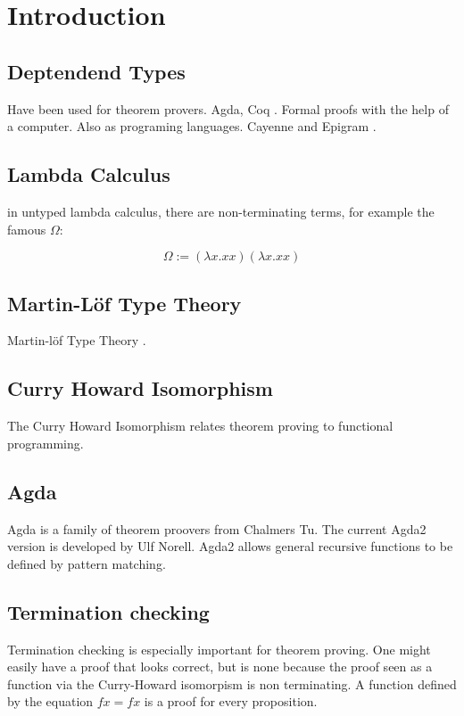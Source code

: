 \chapter{Introduction}
\section {Deptendend Types}
Have been used for theorem provers.
Agda, Coq \cite{coq}.
Formal proofs with the help of a computer.
Also as programing languages. Cayenne \cite{augustsson98cayenne} and Epigram \cite{epigram}. 
\section{Lambda Calculus}

in untyped lambda calculus, there are non-terminating terms, for example the famous \( \Omega \):

\[ \Omega := (\lambda x . x x) (\lambda x . x x) \]


\section{Martin-L\"of Type Theory}
Martin-l\"of Type Theory \cite{mart84}.
\section {Curry Howard Isomorphism}
The Curry Howard Isomorphism relates theorem proving to functional programming.
\section{Agda}

Agda is a family of theorem proovers from Chalmers Tu.
The current Agda2 version is developed by Ulf Norell.
Agda2 allows general recursive functions to be defined by pattern matching.

\section {Termination checking}
Termination checking is especially important for theorem proving.
One might easily have a proof that looks correct, but is none because the proof seen as a function
via the Curry-Howard isomorpism is non terminating.
A function defined by the equation $ f x = f x $ is a proof for every proposition.

